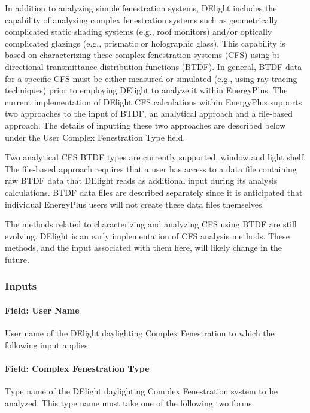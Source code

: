 In addition to analyzing simple fenestration systems, DElight includes the capability of analyzing complex fenestration systems such as geometrically complicated static shading systems (e.g., roof monitors) and/or optically complicated glazings (e.g., prismatic or holographic glass). This capability is based on characterizing these complex fenestration systems (CFS) using bi-directional transmittance distribution functions (BTDF). In general, BTDF data for a specific CFS must be either measured or simulated (e.g., using ray-tracing techniques) prior to employing DElight to analyze it within EnergyPlus. The current implementation of DElight CFS calculations within EnergyPlus supports two approaches to the input of BTDF, an analytical approach and a file-based approach. The details of inputting these two approaches are described below under the User Complex Fenestration Type field.

Two analytical CFS BTDF types are currently supported, window and light shelf. The file-based approach requires that a user has access to a data file containing raw BTDF data that DElight reads as additional input during its analysis calculations. BTDF data files are described separately since it is anticipated that individual EnergyPlus users will not create these data files themselves.

The methods related to characterizing and analyzing CFS using BTDF are still evolving. DElight is an early implementation of CFS analysis methods. These methods, and the input associated with them here, will likely change in the future.

\subsubsection{Inputs}\label{inputs-3-007}

\paragraph{Field: User Name}\label{field-user-name}

User name of the DElight daylighting Complex Fenestration to which the following input applies.

\paragraph{Field: Complex Fenestration Type}\label{field-complex-fenestration-type}

Type name of the DElight daylighting Complex Fenestration system to be analyzed. This type name must take one of the following two forms.


